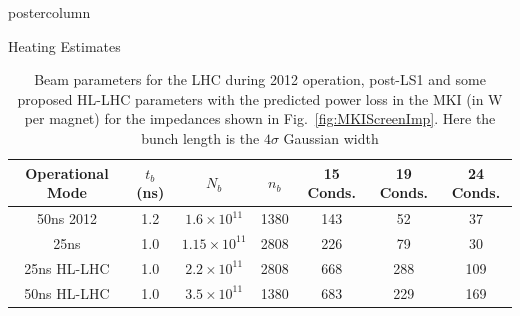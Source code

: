 \documentclass[final,hyperref={pdfpagelabels=false}]{beamer}
\begin{document}
\begin{frame}
\begin{columns}
\begin{column}{.49\textwidth}
\begin{beamercolorbox}[center,wd=\textwidth]{postercolumn}
\begin{minipage}[T]{.95\textwidth}
{\begin{block}{Heating Estimates}
\small{
\begin{table}
\caption{Beam parameters for the LHC during 2012 operation, post-LS1 and some proposed HL-LHC parameters with the predicted power loss in the MKI (in W per magnet) for the impedances shown in Fig.~\ref{fig:MKIScreenImp}. Here the bunch length is the $4\sigma$ Gaussian width}
\label{tab:BrenHLPara}
\begin{center}
\begin{tabular}{c | c | c | c | c | c | c}
Operational Mode & $t_{b}$ (ns) & $N_{b}$ & $n_{b}$ & 15 Conds. & 19 Conds.& 24 Conds.\\ \hline
50ns 2012 & 1.2 & $1.6 \times 10^{11}$ & 1380 & 143 & 52 & 37 \\ \hline
25ns & 1.0 & $1.15 \times 10^{11}$ & 2808 & 226 & 79 & 30 \\ \hline
25ns HL-LHC & 1.0 &  $2.2 \times 10^{11}$ & 2808 & 668 & 288 & 109 \\ \hline
50ns HL-LHC & 1.0 &  $3.5 \times 10^{11}$ & 1380 & 683 & 229 & 169 \\ 
\end{tabular}
\end{center}
\end{table}



}
\end{block}}
\end{minipage}
\end{beamercolorbox}
\end{column}
\end{columns}
\end{frame}
\end{document}
